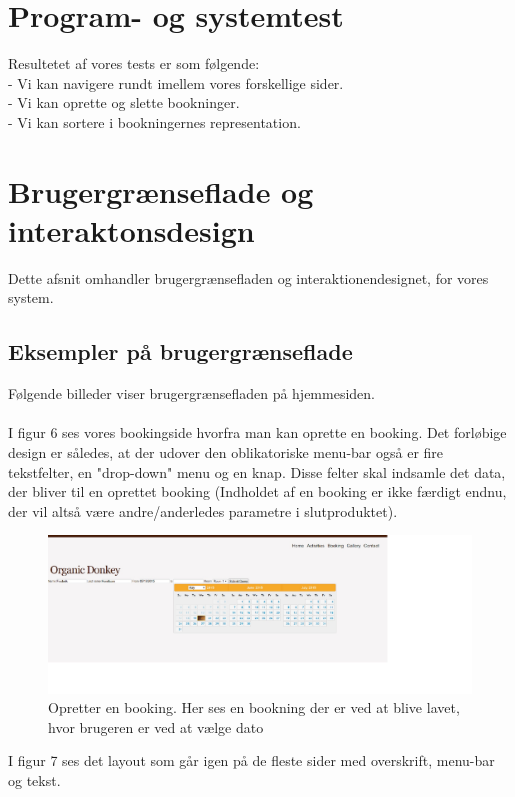\documentclass[12pt,a4paper]{article}
\begin{document}
\section{Program- og systemtest}
Resultetet af vores tests er som følgende:\\
- Vi kan navigere rundt imellem vores forskellige sider.\\
- Vi kan oprette og slette bookninger.\\
- Vi kan sortere i bookningernes representation.

\newpage
\section{Brugergrænseflade og interaktonsdesign}
Dette afsnit omhandler brugergrænsefladen og interaktionendesignet, for vores system. 
\subsection{Eksempler på brugergrænseflade}
Følgende billeder viser brugergrænsefladen på hjemmesiden.\\\\
I figur 6 ses vores bookingside hvorfra man kan oprette en booking. 
Det forløbige design er således, at der udover den oblikatoriske menu-bar 
også er fire tekstfelter, en "drop-down" menu og en knap.
Disse felter skal indsamle det data, der bliver til en oprettet booking 
(Indholdet af en booking er ikke færdigt endnu, 
der vil altså være andre/anderledes parametre i slutproduktet). 
\begin{figure}[H]
\centering
\includegraphics[scale=0.5] {brugergransefladebilled1.jpg}
\caption{Opretter en booking. Her ses en bookning der er ved at blive lavet, hvor brugeren er ved at vælge dato}
\end{figure}
\newpage
I figur 7 ses det layout som går igen på de fleste sider
 med overskrift, menu-bar og tekst.
\end{document}
